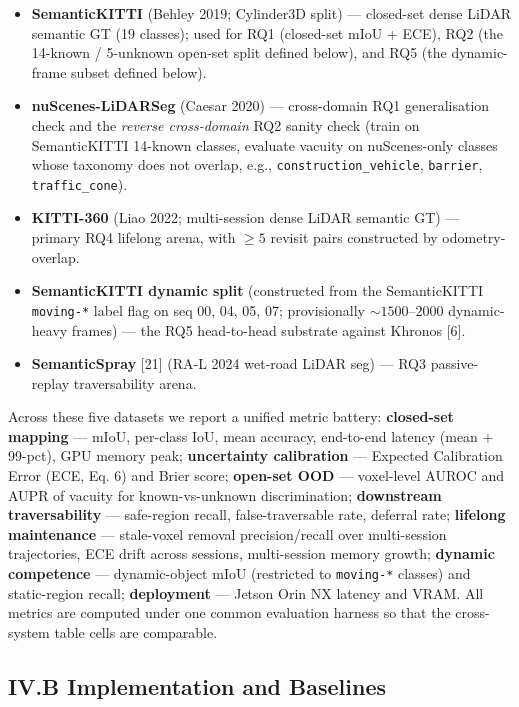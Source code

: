 \documentclass[
]{article}
\providecommand{\tightlist}{%
  \setlength{\itemsep}{0pt}\setlength{\parskip}{0pt}}
\begin{document}
\begin{itemize}
\tightlist
\item
  \textbf{SemanticKITTI} (Behley 2019; Cylinder3D split) --- closed-set
  dense LiDAR semantic GT (19 classes); used for RQ1 (closed-set mIoU +
  ECE), RQ2 (the 14-known / 5-unknown open-set split defined below), and
  RQ5 (the dynamic-frame subset defined below).
\item
  \textbf{nuScenes-LiDARSeg} (Caesar 2020) --- cross-domain RQ1
  generalisation check and the \emph{reverse cross-domain} RQ2 sanity
  check (train on SemanticKITTI 14-known classes, evaluate vacuity on
  nuScenes-only classes whose taxonomy does not overlap, e.g.,
  \texttt{construction\_vehicle}, \texttt{barrier},
  \texttt{traffic\_cone}).
\item
  \textbf{KITTI-360} (Liao 2022; multi-session dense LiDAR semantic GT)
  --- primary RQ4 lifelong arena, with \(\ge 5\) revisit pairs
  constructed by odometry-overlap.
\item
  \textbf{SemanticKITTI dynamic split} (constructed from the
  SemanticKITTI \texttt{moving-*} label flag on seq 00, 04, 05, 07;
  provisionally \(\sim 1500\)--\(2000\) dynamic-heavy frames) --- the
  RQ5 head-to-head substrate against Khronos {[}6{]}.
\item
  \textbf{SemanticSpray} {[}21{]} (RA-L 2024 wet-road LiDAR seg) --- RQ3
  passive-replay traversability arena.
\end{itemize}

Across these five datasets we report a unified metric battery:
\textbf{closed-set mapping} --- mIoU, per-class IoU, mean accuracy,
end-to-end latency (mean + 99-pct), GPU memory peak; \textbf{uncertainty
calibration} --- Expected Calibration Error (ECE, Eq. 6) and Brier
score; \textbf{open-set OOD} --- voxel-level AUROC and AUPR of vacuity
for known-vs-unknown discrimination; \textbf{downstream traversability}
--- safe-region recall, false-traversable rate, deferral rate;
\textbf{lifelong maintenance} --- stale-voxel removal precision/recall
over multi-session trajectories, ECE drift across sessions,
multi-session memory growth; \textbf{dynamic competence} ---
dynamic-object mIoU (restricted to \texttt{moving-*} classes) and
static-region recall; \textbf{deployment} --- Jetson Orin NX latency and
VRAM. All metrics are computed under one common evaluation harness so
that the cross-system table cells are comparable.

\subsection{IV.B Implementation and
Baselines}\label{ivb-implementation-and-baselines}
\end{document}
